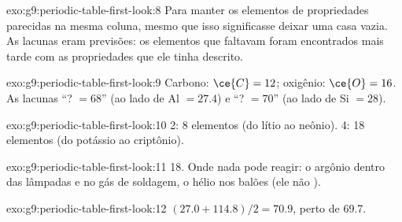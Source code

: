 \begin{solution}{exo:g9:periodic-table-first-look:8}
Para manter os elementos de propriedades parecidas na mesma coluna,
mesmo que isso significasse deixar uma casa vazia. As lacunas eram
previsões: os elementos que faltavam foram encontrados mais tarde com as
propriedades que ele tinha descrito.
\end{solution}

\begin{solution}{exo:g9:periodic-table-first-look:9}
Carbono: $\ce{C} = 12$; oxigênio: $\ce{O} = 16$. As lacunas ``? $= 68$'' (ao lado de
Al $= 27.4$) e ``? $= 70$'' (ao lado de Si $= 28$).
\end{solution}

\begin{solution}{exo:g9:periodic-table-first-look:10}
 2: 8 elementos (do lítio ao neônio).  4: 18 elementos (do
potássio ao criptônio).
\end{solution}

\begin{solution}{exo:g9:periodic-table-first-look:11}
 18. Onde nada pode reagir: o argônio dentro das lâmpadas e no gás
de soldagem, o hélio nos balões (ele não ).
\end{solution}

\begin{solution}{exo:g9:periodic-table-first-look:12}
$(27.0 + 114.8)/2 = 70.9$, perto de 69.7.
\end{solution}

